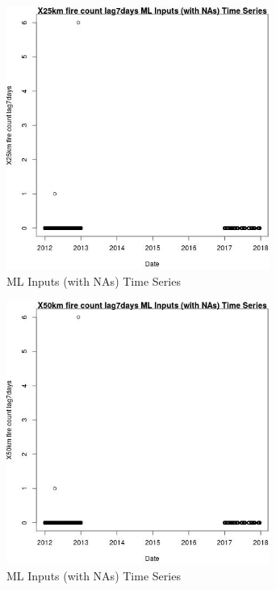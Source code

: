 \begin{figure} 
\centering  
\includegraphics[width=0.77\textwidth]{Code_Outputs/Report_ML_input_PM25_Step4_part_e_de_duplicated_aves_compiled_2019-05-14wNAs_X25km_fire_count_lag7daysvDate.jpg} 
\caption{\label{fig:Report_ML_input_PM25_Step4_part_e_de_duplicated_aves_compiled_2019-05-14wNAsX25km_fire_count_lag7daysvDate}ML Inputs (with NAs) Time Series} 
\end{figure} 
 

\begin{figure} 
\centering  
\includegraphics[width=0.77\textwidth]{Code_Outputs/Report_ML_input_PM25_Step4_part_e_de_duplicated_aves_compiled_2019-05-14wNAs_X50km_fire_count_lag7daysvDate.jpg} 
\caption{\label{fig:Report_ML_input_PM25_Step4_part_e_de_duplicated_aves_compiled_2019-05-14wNAsX50km_fire_count_lag7daysvDate}ML Inputs (with NAs) Time Series} 
\end{figure} 
 

